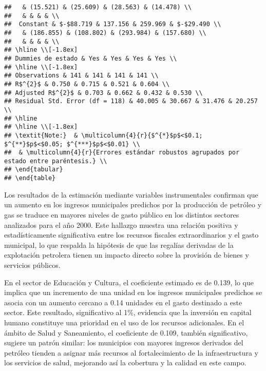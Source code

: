 \documentclass[
]{article}
\begin{document}
\begin{verbatim}
##   & (15.521) & (25.609) & (28.563) & (14.478) \\ 
##   & & & & \\ 
##  Constant & $-$88.719 & 137.156 & 259.969 & $-$29.490 \\ 
##   & (186.855) & (108.802) & (293.984) & (157.680) \\ 
##   & & & & \\ 
## \hline \\[-1.8ex] 
## Dummies de estado & Yes & Yes & Yes & Yes \\ 
## \hline \\[-1.8ex] 
## Observations & 141 & 141 & 141 & 141 \\ 
## R$^{2}$ & 0.750 & 0.715 & 0.521 & 0.604 \\ 
## Adjusted R$^{2}$ & 0.703 & 0.662 & 0.432 & 0.530 \\ 
## Residual Std. Error (df = 118) & 40.005 & 30.667 & 31.476 & 20.257 \\ 
## \hline 
## \hline \\[-1.8ex] 
## \textit{Note:}  & \multicolumn{4}{r}{$^{*}$p$<$0.1; $^{**}$p$<$0.05; $^{***}$p$<$0.01} \\ 
##  & \multicolumn{4}{r}{Errores estándar robustos agrupados por estado entre paréntesis.} \\ 
## \end{tabular} 
## \end{table}
\end{verbatim}

Los resultados de la estimación mediante variables instrumentales
confirman que un aumento en los ingresos municipales predichos por la
producción de petróleo y gas se traduce en mayores niveles de gasto
público en los distintos sectores analizados para el año 2000. Este
hallazgo muestra una relación positiva y estadísticamente significativa
entre los recursos fiscales extraordinarios y el gasto municipal, lo que
respalda la hipótesis de que las regalías derivadas de la explotación
petrolera tienen un impacto directo sobre la provisión de bienes y
servicios públicos.

En el sector de Educación y Cultura, el coeficiente estimado es de
0.139, lo que implica que un incremento de una unidad en los ingresos
municipales predichos se asocia con un aumento cercano a 0.14 unidades
en el gasto destinado a este sector. Este resultado, significativo al
1\%, evidencia que la inversión en capital humano constituye una
prioridad en el uso de los recursos adicionales. En el ámbito de Salud y
Saneamiento, el coeficiente de 0.109, también significativo, sugiere un
patrón similar: los municipios con mayores ingresos derivados del
petróleo tienden a asignar más recursos al fortalecimiento de la
infraestructura y los servicios de salud, mejorando así la cobertura y
la calidad en este campo.
\end{document}
